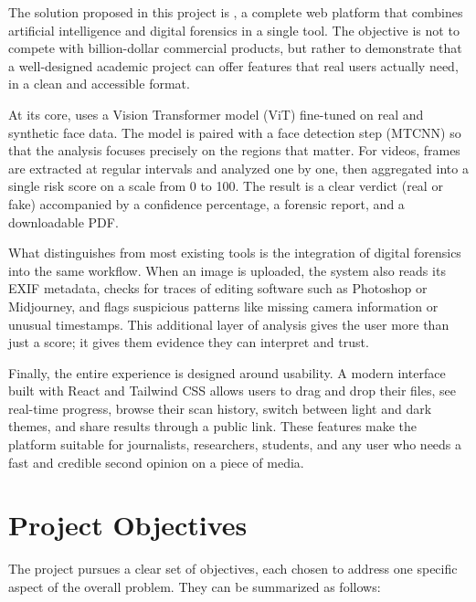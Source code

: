 The solution proposed in this project is \deepguard{}, a complete web platform that combines artificial intelligence and digital forensics in a single tool. The objective is not to compete with billion-dollar commercial products, but rather to demonstrate that a well-designed academic project can offer features that real users actually need, in a clean and accessible format.

At its core, \projectname{} uses a Vision Transformer model (ViT) fine-tuned on real and synthetic face data. The model is paired with a face detection step (MTCNN) so that the analysis focuses precisely on the regions that matter. For videos, frames are extracted at regular intervals and analyzed one by one, then aggregated into a single risk score on a scale from 0 to 100. The result is a clear verdict (real or fake) accompanied by a confidence percentage, a forensic report, and a downloadable PDF.

What distinguishes \projectname{} from most existing tools is the integration of digital forensics into the same workflow. When an image is uploaded, the system also reads its EXIF metadata, checks for traces of editing software such as Photoshop or Midjourney, and flags suspicious patterns like missing camera information or unusual timestamps. This additional layer of analysis gives the user more than just a score; it gives them evidence they can interpret and trust.

Finally, the entire experience is designed around usability. A modern interface built with React and Tailwind CSS allows users to drag and drop their files, see real-time progress, browse their scan history, switch between light and dark themes, and share results through a public link. These features make the platform suitable for journalists, researchers, students, and any user who needs a fast and credible second opinion on a piece of media.

\section{Project Objectives}

The project pursues a clear set of objectives, each chosen to address one specific aspect of the overall problem. They can be summarized as follows:

